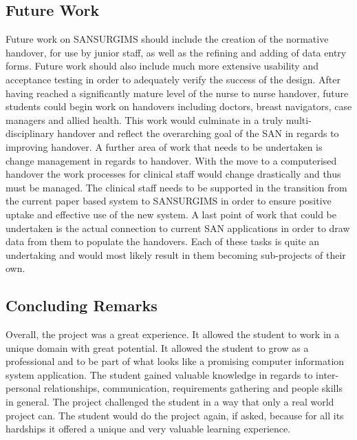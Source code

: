 \newpage
\subsection{Future Work}
Future work on SANSURGIMS should include the creation of the normative handover, for use by junior staff, as well as the refining and adding of data entry forms. Future work should also include much more extensive usability and acceptance testing in order to adequately verify the success of the design. After having reached a significantly mature level of the nurse to nurse handover, future students could begin work on handovers including doctors, breast navigators, case managers and allied health. This work would culminate in a truly multi-disciplinary handover and reflect the overarching goal of the SAN in regards to improving handover. A further area of work that needs to be undertaken is change management in regards to handover. With the move to a computerised handover the work processes for clinical staff would change drastically and thus must be managed. The clinical staff needs to be supported in the transition from the current paper based system to SANSURGIMS in order to ensure positive uptake and effective use of the new system. A last point of work that could be undertaken is the actual connection to current SAN applications in order to draw data from them to populate the handovers. Each of these tasks is quite an undertaking and would most likely result in them becoming sub-projects of their own.

\subsection{Concluding Remarks}
Overall, the project was a great experience. It allowed the student to work in a unique domain with great potential. It allowed the student to grow as a professional and to be part of what looks like a promising computer information system application. The student gained valuable knowledge in regards to inter-personal relationships, communication, requirements gathering and people skills in general. The project challenged the student in a way that only a real world project can. The student would do the project again, if asked, because for all its hardships it offered a unique and very valuable learning experience. 